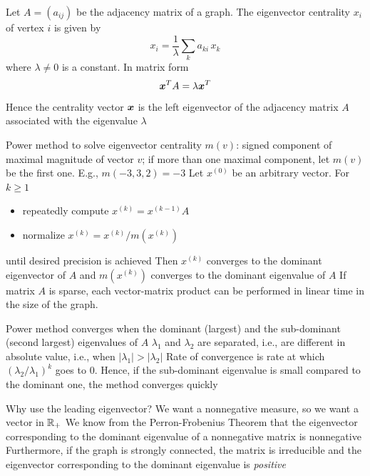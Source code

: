 \documentclass[aspectratio=169]{beamer}\usepackage[]{graphicx}\usepackage[]{xcolor}
\begin{document}
\begin{frame}
	Let $A = (a_{ij})$ be the adjacency matrix of a graph. The eigenvector centrality $x_{i}$ of vertex $i$ is given by
	$$
	x_i = \frac{1}{\lambda} \sum_k a_{ki} \, x_k
	$$ 
	where $\lambda \neq 0$ is a constant. In matrix form
	$$
	\bm{x}^T A=\lambda\bm{x}^T
	$$
\vfill
Hence the centrality vector $\bm{x}$ is the left eigenvector of the adjacency matrix $A$ associated with the eigenvalue $\lambda$
\end{frame}


\begin{frame}{Power method to solve eigenvector centrality}
$m(v)$: signed component of maximal magnitude of vector $v$; if more than one maximal component, let $m(v)$ be the first one. E.g., $m(-3,3,2) = -3$
\vfill
Let $x^{(0)}$ be an arbitrary vector. For $k \geq 1$
\begin{itemize}
	\item repeatedly compute $x^{(k)} = x^{(k-1)} A$
	\item normalize $x^{(k)} = x^{(k)} / m(x^{(k)})$
\end{itemize}
until desired precision is achieved
\vfill
Then $x^{(k)}$ converges to the dominant eigenvector of $A$ and $m(x^{(k)})$ converges to the dominant eigenvalue of $A$
\vfill
If matrix $A$ is sparse, each vector-matrix product can be performed in linear time in the size of the graph.
\end{frame}


\begin{frame}
Power method converges when the dominant (largest) and the sub-dominant (second largest) eigenvalues of $A$ $\lambda_1$ and $\lambda_2$ are separated, i.e., are different in absolute value, i.e., when $|\lambda_1| > |\lambda_2|$
\vfill
Rate of convergence is rate at which $(\lambda_2 / \lambda_1)^k$ goes to $0$. Hence, if the sub-dominant eigenvalue is small compared to the dominant one, the method converges quickly
\end{frame}


\begin{frame}{Why use the leading eigenvector?}
	We want a nonnegative measure, so we want a vector in $\mathbb{R}_+$
	\vfill
	We know from the Perron-Frobenius Theorem that the eigenvector corresponding to the dominant eigenvalue of a nonnegative matrix is nonnegative
	\vfill
	Furthermore, if the graph is strongly connected, the matrix is irreducible and the eigenvector corresponding to the dominant eigenvalue is \emph{positive}
\end{frame}
\end{document}
